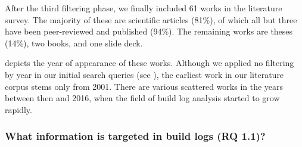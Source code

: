 After the third filtering phase, we finally included 61 works in the
literature survey.
The majority of these are scientific articles (81\%), of which all but
three have been peer-reviewed and published (94\%).
The remaining works are theses (14\%), two books, and one slide deck.

 depicts the year of appearance of these
works.
Although we applied no filtering by year in our initial search queries
(see ), the earliest work in our literature corpus
stems only from 2001.
There are various scattered works in the years between then and 2016,
when the field of build log analysis started to grow rapidly.


\subsubsection{What information is targeted in build logs (RQ 1.1)?}
\label{sec:rq11}
